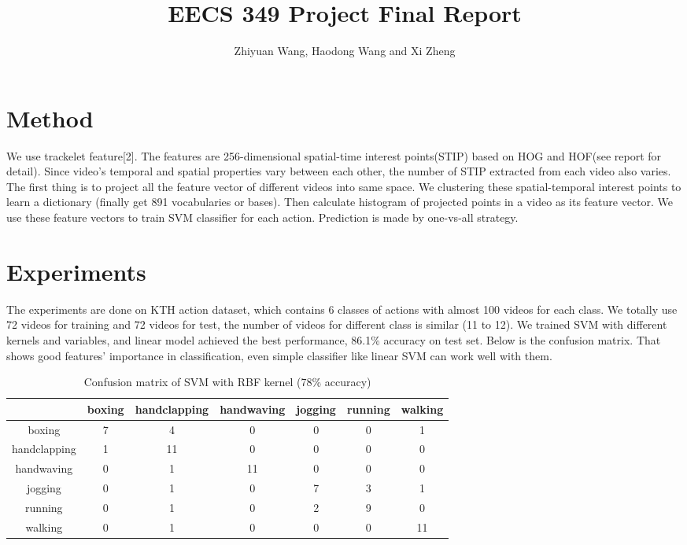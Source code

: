 \documentclass{article}
\begin{document}
\title{EECS 349 Project Final Report}
\author{Zhiyuan Wang, Haodong Wang and Xi Zheng}
\maketitle
\section{Method}
We use trackelet feature[2]. The features are 256-dimensional spatial-time interest points(STIP) based on HOG and HOF(see report for detail). Since video's temporal and spatial properties vary between each other, the number of STIP extracted from each video also varies. The first thing is to project all the feature vector of different videos into same space. We clustering these spatial-temporal interest points to learn a dictionary (finally get 891 vocabularies or bases). Then calculate histogram of projected points in a video as its feature vector. We use these feature vectors to train SVM classifier for each action. Prediction is made by one-vs-all strategy. 
\section{Experiments}
The experiments are done on KTH action dataset, which contains 6 classes of actions with almost 100 videos for each class. We totally use 72 videos for training and 72 videos for test, the number of videos for different class is similar (11 to 12). We trained SVM with different kernels and variables, and linear model achieved the best performance, 86.1\% accuracy on test set. Below is the confusion matrix. That shows good features' importance in classification, even simple classifier like linear SVM can work well with them. 
\begin{table}
\caption{Confusion matrix of SVM with RBF kernel (78\% accuracy)}
\begin{center}
\begin{tabular}{c|cccccc}\hline
&boxing&handclapping &handwaving &jogging &running &walking\\ \hline
boxing&7& 4& 0& 0& 0& 1\\
handclapping&1& 11& 0& 0& 0& 0\\
handwaving&0& 1& 11&0 &0 &0 \\
jogging&0& 1& 0&7 &3 &1 \\
running&0& 1&0 &2 &9 &0 \\
walking&0&1 &0 &0 &0 &11 \\ \hline
\end{tabular}
\end{center}
\end{table} 
\end{document}
